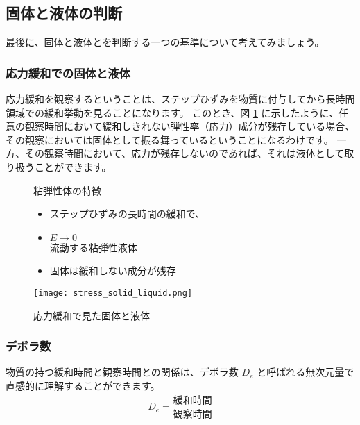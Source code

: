 \documentclass[uplatex,dvipdfmx,a4paper,11pt]{jsreport}
\begin{document}
\subsection{固体と液体の判断}
最後に、固体と液体とを判断する一つの基準について考えてみましょう。

\subsubsection{応力緩和での固体と液体}
応力緩和を観察するということは、ステップひずみを物質に付与してから長時間領域での緩和挙動を見ることになります。
このとき、図 \ref{fig:kotaitoekitai} に示したように、任意の観察時間において緩和しきれない弾性率（応力）成分が残存している場合、
その観察においては固体として振る舞っているということになるわけです。
一方、その観察時間において、応力が残存しないのであれば、それは液体として取り扱うことができます。

\begin{figure}[htb]
	\begin{center}
		\begin{minipage}{0.45\textwidth}
			\begin{itembox}[l]{粘弾性体の特徴}
				\begin{itemize}
					\item ステップひずみの長時間の緩和で、
					\item $E \rightarrow 0$\\
					流動する粘弾性液体
					\item 固体は緩和しない成分が残存
				\end{itemize}
			\end{itembox}
		\end{minipage}
		\begin{minipage}{0.45\textwidth}
			\begin{center}
			\texttt{[image: stress\_solid\_liquid.png]}
			\end{center}
		\end{minipage}
		\caption{応力緩和で見た固体と液体}
		\label{fig:kotaitoekitai}
	\end{center}
\end{figure}

\subsubsection{デボラ数}

物質の持つ緩和時間と観察時間との関係は、デボラ数 $D_e$ と呼ばれる無次元量で直感的に理解することができます。
\begin{align*}
	D_e = \dfrac{\text{緩和時間}}{\text{観察時間}}
\end{align*}
\end{document}
